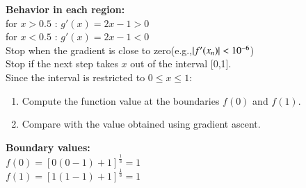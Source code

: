 \documentclass[journal]{IEEEtran}
\begin{document}
\textbf{Behavior in each region:}\\
for $x>0.5$ : $g'(x) = 2x - 1>0$\\
for $x<0.5$ : $g'(x) = 2x - 1<0$\\
Stop when the gradient is close to zero(e.g.,$\left\vert f'(x_n)\right\vert< 10^{-6}$)\\
Stop if the next step takes $x$ out of the interval [0,1].\\
Since the interval is restricted to $0\leq x \leq 1$:\\
\begin{enumerate}
    \item Compute the function value at the boundaries $f(0)$ and $f(1)$.
    \item Compare with the value obtained using gradient ascent.
\end{enumerate}
\textbf{Boundary values:}\\
$f(0) = [0(0-1)+1]^{\frac{1}{3}} = 1$\\
$f(1) = [1(1-1)+1]^{\frac{1}{3}} = 1$
\end{document}
